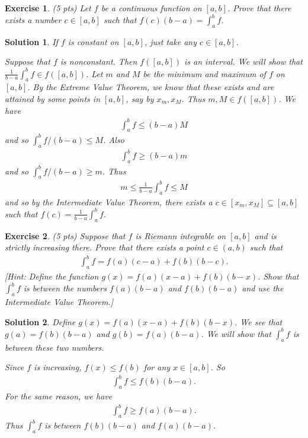 \documentclass[12pt]{article}
\theoremstyle{plain}
\newtheorem{exer}{\textbf{Exercise}}}
\theoremstyle{plain}
\newtheorem*{sol}{\textbf{Solution}}}
\theoremstyle{plain}
\theoremstyle{plain}
\begin{document}
\begin{exer}
(5 pts)
Let $f$ be a continuous function on $[a, b]$. Prove that there exists a number $c \in [a, b]$ such that $f(c) (b - a) = \int_a^b f$.
\end{exer}
\begin{sol}
If $f$ is constant on $[a, b]$, just take any $c \in [a, b]$.

Suppose that $f$ is nonconstant. Then $f([a, b])$ is an interval. We will show that $\frac{1}{b - a} \int_a^b f \in f ([a, b])$. Let $m$ and $M$ be the minimum and maximum of $f$ on $[a, b]$. By the Extreme Value Theorem, we know that these exists and are attained by some points in $[a, b]$, say by $x_m, x_M$. Thus $m, M \in f ([a, b])$. We have
	\begin{align*}
	\int_a^b f \leq (b - a) M 
	\end{align*}
and so $\int_a^b f / (b - a) \leq M$. Also
	\begin{align*}
	\int_a^b f \geq (b - a) m
	\end{align*}
and so $\int_a^b f/ (b -a) \geq m$. Thus 
	\begin{align*}
	m \leq \frac{1}{b-a} \int_a^b f \leq M
	\end{align*}
and so by the Intermediate Value Theorem, there exists a $c \in [x_m, x_M] \subseteq [a, b]$ such that $f (c) = \frac{1}{b-a} \int_a^b f$. 
\end{sol}

\begin{exer}
(5 pts)
Suppose that $f$ is Riemann integrable on $[a, b]$ and is strictly increasing there. Prove that there exists a point $c \in (a, b)$ such that 
	\begin{align*}
	\int_a^b f = f(a) (c - a) + f(b) (b - c).
	\end{align*}
[Hint: Define the function $g(x) = f(a) (x - a) + f(b) (b - x)$. Show that $\int_a^b f$ is between the numbers $f(a) (b - a)$ and $f(b) (b - a)$ and use the Intermediate Value Theorem.]
\end{exer}
\begin{sol}
Define $g(x) = f(a) (x - a) + f(b) (b - x)$. We see that $g(a) = f(b) (b -a)$ and $g(b) = f(a) (b - a)$. We will show that $\int_a^b f$ is between these two numbers.

Since $f$ is increasing, $f(x) \leq f(b)$ for any $x \in [a, b]$. So
	\begin{align*}
	\int_a^b f \leq f(b) (b - a) .
	\end{align*}
For the same reason, we have
	\begin{align*}
	\int_a^b f \geq f(a) (b - a) .
	\end{align*}
Thus $\int_a^b f$ is between $f(b) (b - a)$ and $f(a) (b - a)$.
\end{sol}
\end{document}
